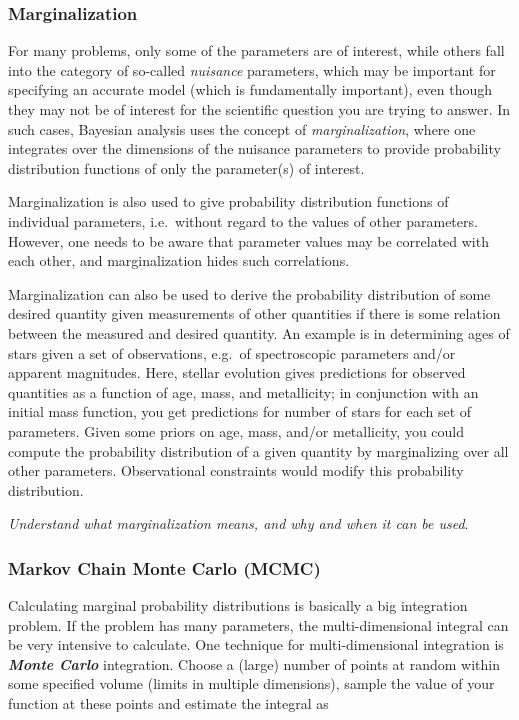 \documentclass[12pt]{article}
\begin{document}
\subsubsection{Marginalization}

For many problems, only some of the parameters are of interest, while
others fall into the category of so-called \emph{nuisance} parameters, which
may be important for specifying an accurate model (which is
fundamentally important), even though they may not be of interest for
the scientific question you are trying to answer. In such cases,
Bayesian analysis uses the concept of \emph{marginalization}, where one
integrates over the dimensions of the nuisance parameters to provide
probability distribution functions of only the parameter(s) of
interest.

Marginalization is also used to give probability distribution
functions of individual parameters, i.e.\ without regard to the values
of other parameters. However, one needs to be aware that parameter
values may be correlated with each other, and marginalization hides
such correlations.

Marginalization can also be used to derive the probability
distribution of some desired quantity given measurements of other
quantities if there is some relation between the measured and desired
quantity. An example is in determining ages of stars given a set of
observations, e.g.\ of spectroscopic parameters and/or apparent
magnitudes. Here, stellar evolution gives predictions for observed
quantities as a function of age, mass, and metallicity; in conjunction
with an initial mass function, you get predictions for number of stars
for each set of parameters. Given some priors on age, mass, and/or
metallicity, you could compute the probability distribution of a given
quantity by marginalizing over all other parameters. Observational
constraints would modify this probability distribution.

\emph{Understand what marginalization means, and why and when it can
be used}.


\subsubsection{Markov Chain Monte Carlo (MCMC)}
Calculating marginal probability distributions is basically a big
integration problem. If the problem has many parameters, the
multi-dimensional integral can be very intensive to calculate.
One technique for multi-dimensional integration is
\textbf{\emph{Monte Carlo}} integration. Choose a (large) number of points
at random within some specified volume (limits in multiple
dimensions), sample the value of your function at these points
and estimate the integral as
\end{document}

